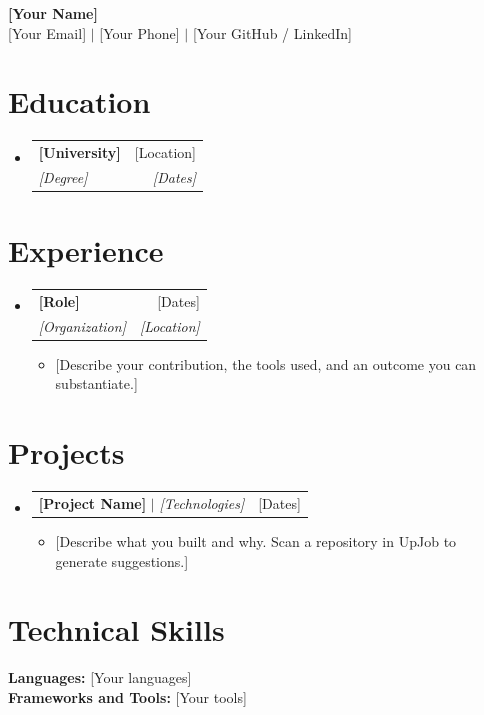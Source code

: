 \documentclass[letterpaper,11pt]{article}
\makeatletter
\newcommand{\resumeItem}[1]{\item\small{#1\vspace{-2pt}}}
\newcommand{\resumeSubheading}[4]{\item\begin{tabular*}{0.97\textwidth}{l@{\extracolsep{\fill}}r}\textbf{#1} & #2 \\ \textit{\small #3} & \textit{\small #4} \\\end{tabular*}}
\newcommand{\resumeProjectHeading}[2]{\item\begin{tabular*}{0.97\textwidth}{l@{\extracolsep{\fill}}r}\small #1 & #2 \\\end{tabular*}}
\newcommand{\resumeSubHeadingListStart}{\begin{itemize}[leftmargin=0.15in,label={}]}
\newcommand{\resumeSubHeadingListEnd}{\end{itemize}}
\newcommand{\resumeItemListStart}{\begin{itemize}}
\newcommand{\resumeItemListEnd}{\end{itemize}\vspace{-5pt}}
\makeatother
\begin{document}
\begin{center}
  \textbf{\Huge [Your Name]} \\
  \small [Your Email] $|$ [Your Phone] $|$ [Your GitHub / LinkedIn]
\end{center}
\section{Education}
\resumeSubHeadingListStart
  \resumeSubheading{[University]}{[Location]}{[Degree]}{[Dates]}
\resumeSubHeadingListEnd
\section{Experience}
\resumeSubHeadingListStart
  \resumeSubheading{[Role]}{[Dates]}{[Organization]}{[Location]}
  \resumeItemListStart
    \resumeItem{[Describe your contribution, the tools used, and an outcome you can substantiate.]}
  \resumeItemListEnd
\resumeSubHeadingListEnd
\section{Projects}
\resumeSubHeadingListStart
  \resumeProjectHeading{\textbf{[Project Name]} $|$ \emph{[Technologies]}}{[Dates]}
  \resumeItemListStart
    \resumeItem{[Describe what you built and why. Scan a repository in UpJob to generate suggestions.]}
  \resumeItemListEnd
\resumeSubHeadingListEnd
\section{Technical Skills}
\textbf{Languages:} [Your languages] \\
\textbf{Frameworks and Tools:} [Your tools]
\end{document}
